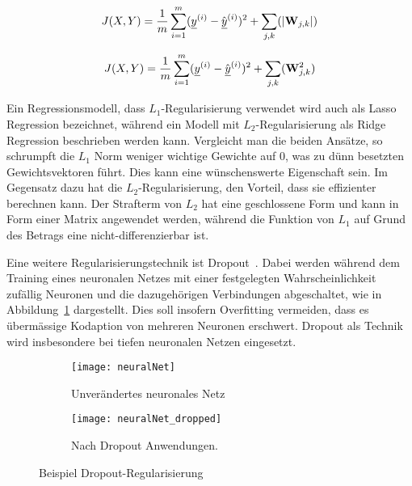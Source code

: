 \begin{equation} \label{eqn:MSE-L1}
	J(X, Y) = \frac{1}{m} \sum_{i=1}^{m} ({\underline{y}}^{(i)} - \hat{{\underline{y}}}^{(i)})^2 + \sum_{j, k} (|{{\mathbf{W}}}_{j,k}|)
\end{equation} 

\begin{equation} \label{eqn:MSE-L2}
	J(X, Y) = \frac{1}{m} \sum_{i=1}^{m} ({\underline{y}}^{(i)} - \hat{{\underline{y}}}^{(i)})^2 + \sum_{j, k} ({{\mathbf{W}}}_{j,k}^2)
\end{equation} 


Ein Regressionsmodell, dass \(L_1\)-Regularisierung verwendet wird auch als Lasso Regression bezeichnet, 
während ein Modell mit \(L_2\)-Regularisierung als Ridge Regression beschrieben werden kann.
Vergleicht man die beiden Ansätze, so schrumpft die \(L_1\) Norm weniger wichtige Gewichte auf 0, was zu dünn besetzten Gewichtsvektoren führt.
Dies kann eine wünschenswerte Eigenschaft sein.
Im Gegensatz dazu hat die \(L_2\)-Regularisierung, den Vorteil, dass sie effizienter berechnen kann.
Der Strafterm von \(L_2\) hat eine geschlossene Form und kann in Form einer Matrix angewendet werden, während die Funktion von \(L_1\) auf Grund des Betrags eine nicht-differenzierbar ist.



Eine weitere Regularisierungstechnik ist Dropout~\cite{JMLR:v15:srivastava14a}.
Dabei werden während dem Training eines neuronalen Netzes 
mit einer festgelegten Wahrscheinlichkeit zufällig Neuronen und die dazugehörigen Verbindungen abgeschaltet, 
wie in Abbildung~\ref{fig:dropout} dargestellt.
Dies soll insofern Overfitting vermeiden, dass es übermässige Kodaption von mehreren Neuronen erschwert.
Dropout als Technik wird insbesondere bei tiefen neuronalen Netzen eingesetzt. 

\begin{figure}[h]
    \centering
    \begin{subfigure}[t]{0.4\textwidth}
		\texttt{[image: neuralNet]}
		\caption{Unverändertes neuronales Netz}
    \end{subfigure}
    \begin{subfigure}[t]{0.4\textwidth}
		\texttt{[image: neuralNet\_dropped]}
		\caption{Nach Dropout Anwendungen.}
	\end{subfigure}
    \caption{Beispiel Dropout-Regularisierung~\cite{JMLR:v15:srivastava14a}}
    \label{fig:dropout}
\end{figure}


